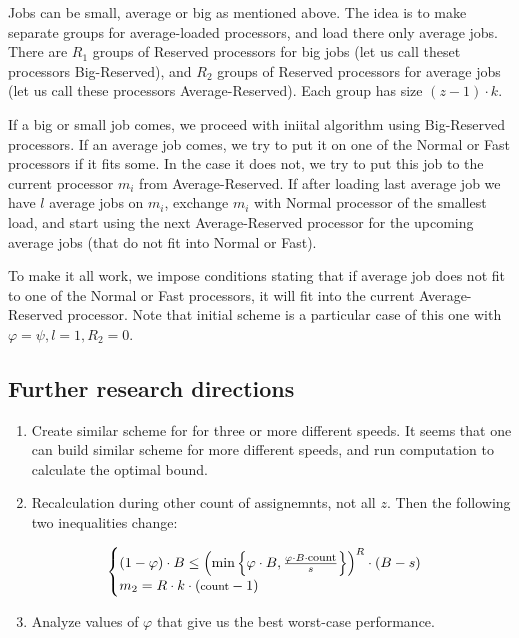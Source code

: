 \documentclass[a4paper, preprint, authoryear]{elsarticle}
\begin{document}
Jobs can be small, average or big as mentioned above.
The idea is to make separate groups for average-loaded processors, 
and load there only average jobs. There are $R_1$ groups of Reserved processors for big jobs (let us call theset processors Big-Reserved), 
and $R_2$ groups of Reserved processors for average jobs (let us call these processors Average-Reserved). Each group
has size $(z - 1) \cdot k$. 

If a big or small job comes, we proceed with iniital algorithm using Big-Reserved processors.
If an average job comes, we try to put it on one of the Normal or Fast processors if it fits some.
In the case it does not, we try to put this job to the current processor $m_i$ from Average-Reserved.
If after loading last average job we have $l$ average jobs on $m_i$, exchange $m_i$ with Normal processor
of the smallest load, and start using the next Average-Reserved processor for the upcoming average jobs 
(that do not fit into Normal or Fast).

To make it all work, we impose conditions stating that if average job does not fit to one of the Normal or Fast processors, it will
fit into the current Average-Reserved processor.
Note that initial scheme is a particular case of this one with $\varphi = \psi, l = 1, R_2 = 0$.


\subsection*{Further research directions}

\begin{enumerate}[itemsep=-1mm]

        \item Create similar scheme for for three or more different speeds.
            It seems that one can build similar scheme for more different speeds,
            and run computation to calculate the optimal bound.

        \item Recalculation during other count of assignemnts, not all $z$. 
            Then the following two inequalities change:
        

            \begin{equation*}
                \begin{cases}
                    (1 - \varphi) \cdot B \leq \left( \min 
                        \left\{ \varphi \cdot B, \frac{ \varphi \cdot B \cdot \mbox{\footnotesize count}}{s}  \right\} 
                        \right) ^ R \cdot (B - s) \\
                    m_2 = R\cdot k \cdot (\mbox{\footnotesize count} - 1)
                \end{cases}
            \end{equation*}


        \item Analyze values of $\varphi$ that give us the best worst-case performance. 

\end{enumerate}
\end{document}
